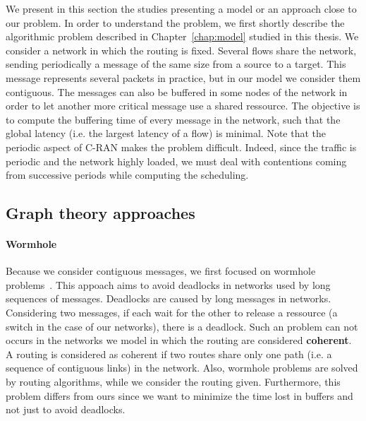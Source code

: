 We present in this section the studies presenting a model or an approach close to our problem.
 In order to understand the problem, we first shortly describe the algorithmic problem described in Chapter~\ref{chap:model} studied in this thesis. We consider a network in which the routing is fixed.
 Several flows share the network, sending periodically a message of the same size from a source to a target. This message represents several packets in practice, but in our model we consider them contiguous. The messages can also be buffered in some nodes of the network in order to let another more critical message use a shared ressource. The objective is to compute the buffering time of every message in the network, such that the global latency (i.e. the largest latency of a flow) is minimal. Note that the periodic aspect of C-RAN makes the problem difficult. Indeed, since the traffic is periodic and the network highly loaded, we must deal with contentions coming from successive periods while computing the scheduling.
 

\subsection{Graph theory approaches}

\paragraph{Wormhole}
Because we consider contiguous messages, we first focused on wormhole problems~\cite{ni1993survey,cole1996benefit}. This appoach aims to avoid deadlocks in networks used by long sequences of messages. Deadlocks are caused by long messages in networks. Considering two messages, if each wait for the other to release a ressource (a switch in the case of our networks), there is a deadlock. Such an problem can not occurs in the networks we model in which the routing are considered \textbf{coherent}\cite{Schwiebert1996ANA}. A routing is considered as coherent if two routes share only one path (i.e. a sequence of contiguous links) in the network.
 Also, wormhole problems are solved by routing algorithms, while we consider the routing given. Furthermore, this problem differs from ours since we want to minimize the time lost in buffers and not just to avoid deadlocks. 

